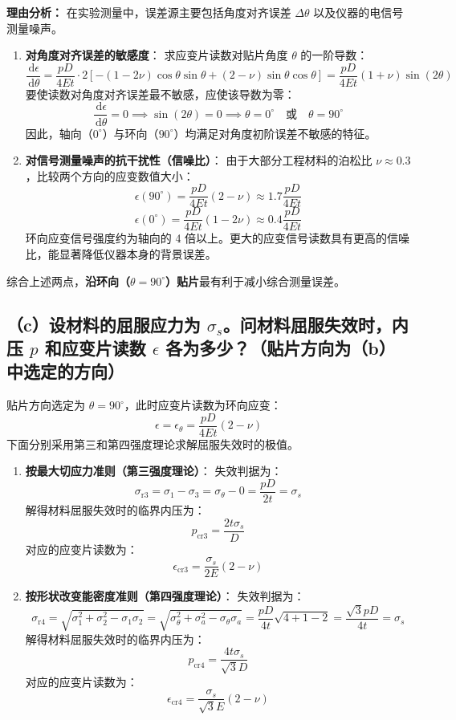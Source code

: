 \documentclass[11pt,a4paper]{ctexrep}
\newcommand{\diff}{\,\mathrm{d}}
\begin{document}
{\textbf{理由分析：}
在实验测量中，误差源主要包括角度对齐误差 $\Delta \theta$ 以及仪器的电信号测量噪声。
\begin{enumerate}
    \item \textbf{对角度对齐误差的敏感度}：
          求应变片读数对贴片角度 $\theta$ 的一阶导数：
          \[
              \frac{\diff \epsilon}{\diff \theta} = \frac{pD}{4Et} \cdot 2 \left[ -(1 - 2\nu)\cos\theta\sin\theta + (2-\nu)\sin\theta\cos\theta \right] = \frac{pD}{4Et} (1+\nu)\sin(2\theta)
          \]
          要使读数对角度对齐误差最不敏感，应使该导数为零：
          \[
              \frac{\diff \epsilon}{\diff \theta} = 0 \implies \sin(2\theta) = 0 \implies \theta = 0^\circ \quad \text{或} \quad \theta = 90^\circ
          \]
          因此，轴向（$0^\circ$）与环向（$90^\circ$）均满足对角度初阶误差不敏感的特征。
    \item \textbf{对信号测量噪声的抗干扰性（信噪比）}：
          由于大部分工程材料的泊松比 $\nu \approx 0.3$，比较两个方向的应变数值大小：
          \[
              \epsilon(90^\circ) = \frac{pD}{4Et} (2-\nu) \approx 1.7 \frac{pD}{4Et}
          \]
          \[
              \epsilon(0^\circ) = \frac{pD}{4Et} (1-2\nu) \approx 0.4 \frac{pD}{4Et}
          \]
          环向应变信号强度约为轴向的 4 倍以上。更大的应变信号读数具有更高的信噪比，能显著降低仪器本身的背景误差。
\end{enumerate}
综合上述两点，\textbf{沿环向（$\theta = 90^\circ$）贴片}最有利于减小综合测量误差。

\subsection*{（c）设材料的屈服应力为 $\sigma_s$。问材料屈服失效时，内压 $p$ 和应变片读数 $\epsilon$ 各为多少？（贴片方向为（b）中选定的方向）}

贴片方向选定为 $\theta = 90^\circ$，此时应变片读数为环向应变：
\[
    \epsilon = \epsilon_\theta = \frac{pD}{4Et} (2 - \nu)
\]
下面分别采用第三和第四强度理论求解屈服失效时的极值。
\begin{enumerate}
    \item \textbf{按最大切应力准则（第三强度理论）}：
          失效判据为：
          \[
              \sigma_{\text{r3}} = \sigma_1 - \sigma_3 = \sigma_\theta - 0 = \frac{pD}{2t} = \sigma_s
          \]
          解得材料屈服失效时的临界内压为：
          \[
              p_{\text{cr3}} = \frac{2t\sigma_s}{D}
          \]
          对应的应变片读数为：
          \[
              \epsilon_{\text{cr3}} = \frac{\sigma_s}{2E} (2 - \nu)
          \]
    \item \textbf{按形状改变能密度准则（第四强度理论）}：
          失效判据为：
          \[
              \sigma_{\text{r4}} = \sqrt{\sigma_1^2 + \sigma_2^2 - \sigma_1\sigma_2} = \sqrt{\sigma_\theta^2 + \sigma_a^2 - \sigma_\theta\sigma_a} = \frac{pD}{4t} \sqrt{4 + 1 - 2} = \frac{\sqrt{3}pD}{4t} = \sigma_s
          \]
          解得材料屈服失效时的临界内压为：
          \[
              p_{\text{cr4}} = \frac{4t\sigma_s}{\sqrt{3}D}
          \]
          对应的应变片读数为：
          \[
              \epsilon_{\text{cr4}} = \frac{\sigma_s}{\sqrt{3}E} (2 - \nu)
          \]
\end{enumerate}


}
\end{document}
